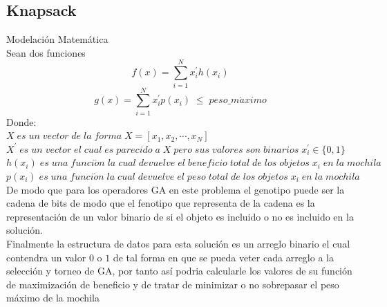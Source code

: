 \documentclass[10pt]{article}
\begin{document}
\subsection{Knapsack}
Modelación Matemática\\
Sean dos funciones
\[f(x)=\sum_{i=1}^{N}x^{'}_{i}h(x_{i})\]
\[g(x)=\sum_{i=1}^{N}x^{'}_{i}p(x_{i})\;\leq\;peso\_m\acute{a}ximo\]
Donde:\\
\(\displaystyle X\;es\;un\;vector\;de\;la\;forma\;X=[x_{1},x_{2},\cdots,x_{N}]\)\\\vspace{0.25cm}
\(\displaystyle X^{'}\;es\;un\;vector\;el\;cual\;es\;parecido\;a\;X\;pero\;sus\;valores\;son\;binarios\;x_{i}^{'}\in\{0,1\}\)\\\vspace{0.25cm}
\(\displaystyle h(x_{i})\;es\;una\;funci\acute{o}n\;la\;cual\;devuelve\;el\;beneficio\;total\;de\;los\;objetos\;x_{i}\;en\;la\;mochila\)\\\vspace{0.25cm}
\(\displaystyle p(x_{i})\;es\;una\;funci\acute{o}n\;la\;cual\;devuelve\;el\;peso\;total\;de\;los\;objetos\;x_{i}\;en\;la\;mochila\)\\\vspace{0.25cm}
De modo que para los operadores GA en este problema el genotipo puede ser la cadena de bits de modo que el fenotipo que representa de la cadena es la representación de un valor binario de si el objeto es incluido o no es incluido en la solución.\\
Finalmente la estructura de datos para esta solución es un arreglo binario el cual contendra un valor $0$ o $1$ de tal forma en que se pueda veter cada arreglo a la selección y torneo de GA, por tanto así podria calcularle los valores de su función de maximización de beneficio y de tratar de minimizar o no sobrepasar el peso máximo de la mochila
\end{document}

